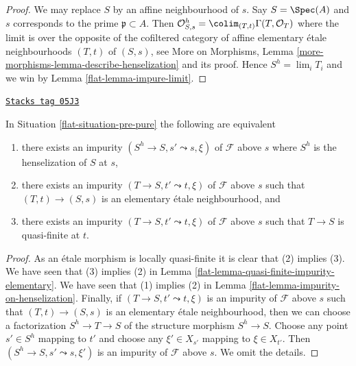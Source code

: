 \begin{proof}

We may replace $S$ by an affine neighbourhood of $s$.
Say $S = \Spec(A)$ and $s$ corresponds to the prime
$\mathfrak p \subset A$. Then
$\mathcal{O}_{S, s}^h = \colim_{(T, t)} \Gamma(T, \mathcal{O}_T)$
where the limit is over the opposite of the
cofiltered category of affine elementary \'etale neighbourhoods
$(T, t)$ of $(S, s)$, see
More on Morphisms,
Lemma \ref{more-morphisms-lemma-describe-henselization}
and its proof. Hence $S^h = \lim_i T_i$ and we win by
Lemma \ref{flat-lemma-impure-limit}.
\end{proof}

\begin{lemma}
\label{flat-lemma-pure-along-X-s}
\href{https://stacks.math.columbia.edu/tag/05J3}{\texttt{Stacks tag 05J3}}

In Situation \ref{flat-situation-pre-pure} the following
are equivalent
\begin{enumerate}
\item there exists an impurity $(S^h \to S, s' \leadsto s, \xi)$
of $\mathcal{F}$ above $s$ where $S^h$ is the henselization of $S$ at $s$,
\item there exists an impurity $(T \to S, t' \leadsto t, \xi)$
of $\mathcal{F}$ above $s$ such that $(T, t) \to (S, s)$ is an
elementary \'etale neighbourhood, and
\item there exists an impurity $(T \to S, t' \leadsto t, \xi)$
of $\mathcal{F}$ above $s$ such that $T \to S$ is quasi-finite at $t$.
\end{enumerate}
\end{lemma}

\begin{proof}

As an \'etale morphism is locally quasi-finite it is clear that
(2) implies (3). We have seen that (3) implies (2) in
Lemma \ref{flat-lemma-quasi-finite-impurity-elementary}.
We have seen that (1) implies (2) in
Lemma \ref{flat-lemma-impurity-on-henselization}.
Finally, if $(T \to S, t' \leadsto t, \xi)$ is an impurity
of $\mathcal{F}$ above $s$ such that $(T, t) \to (S, s)$ is an
elementary \'etale neighbourhood, then we can choose a factorization
$S^h \to T \to S$ of the structure morphism $S^h \to S$.
Choose any point $s' \in S^h$ mapping to $t'$ and choose any
$\xi' \in X_{s'}$ mapping to $\xi \in X_{t'}$. Then
$(S^h \to S, s' \leadsto s, \xi')$ is an impurity of
$\mathcal{F}$ above $s$. We omit the details.
\end{proof}

